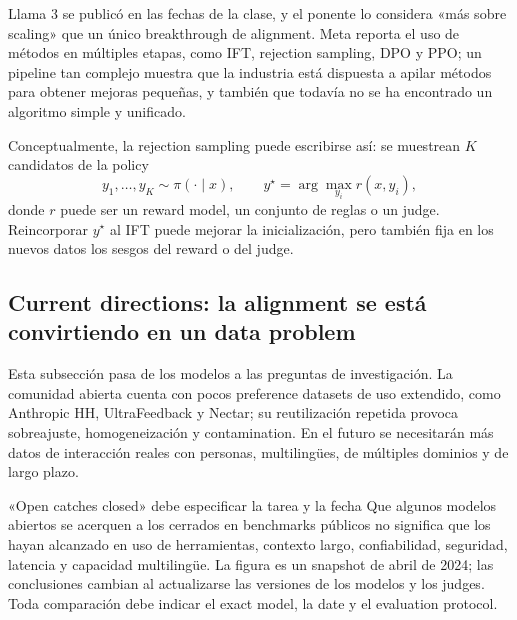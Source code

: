Llama 3 se publicó en las fechas de la clase, y el ponente lo considera «más sobre scaling» que un único breakthrough de alignment. Meta reporta el uso de métodos en múltiples etapas, como IFT, rejection sampling, DPO y PPO; un pipeline tan complejo muestra que la industria está dispuesta a apilar métodos para obtener mejoras pequeñas, y también que todavía no se ha encontrado un algoritmo simple y unificado.


Conceptualmente, la rejection sampling puede escribirse así: se muestrean $K$ candidatos de la policy
\[
y_1,\ldots,y_K\sim\pi(\cdot\mid x),
\qquad y^{\star}=\arg\max_{y_i} r(x,y_i),
\]
donde $r$ puede ser un reward model, un conjunto de reglas o un judge. Reincorporar $y^{\star}$ al IFT puede mejorar la inicialización, pero también fija en los nuevos datos los sesgos del reward o del judge.


\subsection{Current directions: la alignment se está convirtiendo en un data problem}

Esta subsección pasa de los modelos a las preguntas de investigación. La comunidad abierta cuenta con pocos preference datasets de uso extendido, como Anthropic HH, UltraFeedback y Nectar; su reutilización repetida provoca sobreajuste, homogeneización y contamination. En el futuro se necesitarán más datos de interacción reales con personas, multilingües, de múltiples dominios y de largo plazo.



\begin{warningbox}{«Open catches closed» debe especificar la tarea y la fecha}
Que algunos modelos abiertos se acerquen a los cerrados en benchmarks públicos no significa que los hayan alcanzado en uso de herramientas, contexto largo, confiabilidad, seguridad, latencia y capacidad multilingüe. La figura es un snapshot de abril de 2024; las conclusiones cambian al actualizarse las versiones de los modelos y los judges. Toda comparación debe indicar el exact model, la date y el evaluation protocol.
\end{warningbox}

